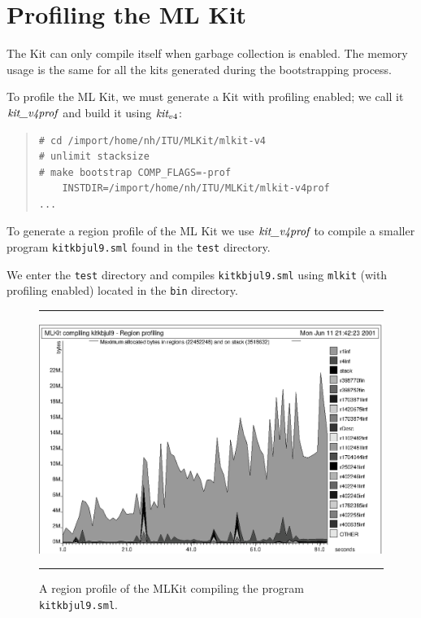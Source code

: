 \documentclass[12pt]{book}
\begin{document}
\section{Profiling the ML Kit}

The Kit can only compile itself when garbage collection is enabled.
The memory usage is the same for all the kits generated during the
bootstrapping process.

To profile the ML Kit, we must generate a Kit with profiling enabled;
we call it $\emph{kit\_v4prof}$  and build it using $\emph{kit}_{v4}$:

\begin{small}
\begin{quote}
\begin{verbatim}
# cd /import/home/nh/ITU/MLKit/mlkit-v4
# unlimit stacksize
# make bootstrap COMP_FLAGS=-prof 
    INSTDIR=/import/home/nh/ITU/MLKit/mlkit-v4prof
...
\end{verbatim}
\end{quote}
\end{small}


To generate a region profile of the ML Kit we use
$\emph{kit\_v4prof}$ to compile a smaller program
\texttt{kitkbjul9.sml} found in the \texttt{test} directory.

We enter the \texttt{test} directory and compiles
\texttt{kitkbjul9.sml} using \texttt{mlkit} (with profiling enabled)
located in the \texttt{bin} directory.

\begin{figure}
\hrule \medskip
\begin{center}
\includegraphics{mlkit_compiling_kitkbjul9.eps}
\end{center}
\caption{A region profile of the MLKit compiling the program \texttt{kitkbjul9.sml}.}
\label{mlkit_compiling_kitkbjul9.fig}
\medskip\hrule
\end{figure}
\end{document}
